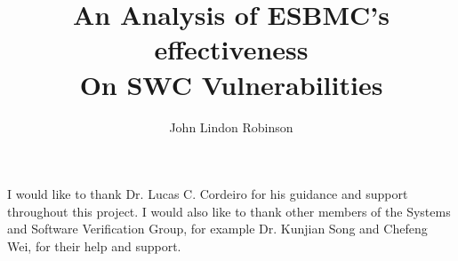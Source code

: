 \documentclass[12pt,BSc,wordcount,twoside]{muthesis}
\begin{document}

\title{An Analysis of ESBMC's effectiveness\\
On SWC Vulnerabilities}
\author{John Lindon Robinson}

\beforeabstract




\afterabstract

I would like to thank Dr. Lucas C. Cordeiro for his guidance and support throughout this project. I would also like to thank other members of the Systems and Software Verification Group, for example Dr. Kunjian Song and Chefeng Wei, for their help and support.

\afterpreface










\end{document}

